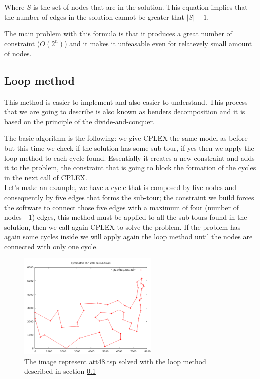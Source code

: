 Where $S$ is the set of nodes that are in the solution. This equation implies that the number of edges in the solution cannot be greater that $|S|-1$.

The main problem with this formula is that it produces a great number of constraint ($O(2^n)$) and it makes it unfeasable even for relatevely small amount of nodes.

\subsection{Loop method}
\label{sec:loop}
This method is easier to implement and also easier to understand. This process that we are going to describe is also known as benders decomposition and it is based on the principle of the divide-and-conquer.

The basic algorithm is the following: we give CPLEX the same model as before but this time we check if the solution has some sub-tour, if yes then we apply the loop method to each cycle found. Essentially it creates a new constraint and adds it to the problem, the constraint that is going to block the formation of the cycles in the next call of CPLEX. \\
Let's make an example, we have a cycle that is composed by five nodes and consequently by five edges that forms the sub-tour; the constraint we build forces the software to connect those five edges with a maximum of four (number of nodes - $1$) edges, this method must be applied to all the sub-tours found in the solution, then we call again CPLEX to solve the problem. If the problem has again some cycles inside we will apply again the loop method until the nodes are connected with only one cycle.

\begin{figure}[h]
	\centering
	\includegraphics[width=0.6\textwidth]{images/symmetric_with_no_tours}
	\caption{The image represent att48.tsp solved with the loop method described in section \ref{sec:loop}}
\end{figure}

